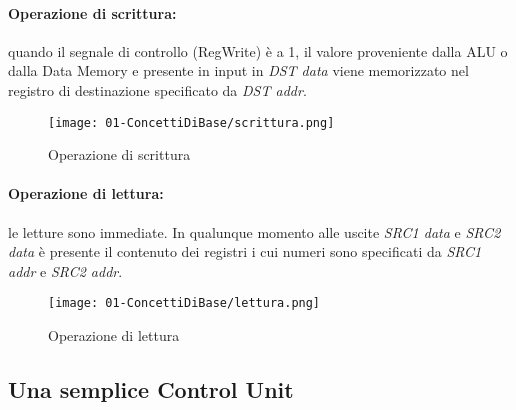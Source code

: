 
\paragraph{Operazione di scrittura:} quando il segnale di controllo (RegWrite) è a 1, il valore proveniente dalla ALU o dalla Data Memory e presente in input in \textit{DST data} viene memorizzato nel registro di destinazione specificato da \textit{DST addr}.
 

\begin{figure}[h]
    \centering
    \texttt{[image: 01-ConcettiDiBase/scrittura.png]}
    \caption{Operazione di scrittura}
\end{figure}

\paragraph{Operazione di lettura:} le letture sono immediate. In qualunque momento alle uscite \textit{SRC1 data} e \textit{SRC2 data} è presente il contenuto dei registri i cui numeri sono specificati da \textit{SRC1 addr} e \textit{SRC2 addr}.


\begin{figure}[h]
    \centering
    \texttt{[image: 01-ConcettiDiBase/lettura.png]}
    \caption{Operazione di lettura}
\end{figure}

\subsection{Una semplice Control Unit}


